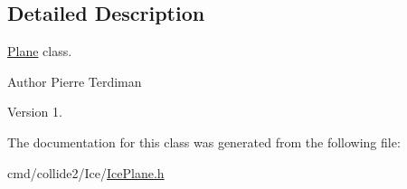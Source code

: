 \subsection{Detailed Description}
\hyperlink{classPlane}{Plane} class.

\begin{DoxyAuthor}{Author}
Pierre Terdiman 
\end{DoxyAuthor}
\begin{DoxyVersion}{Version}
1. 
\end{DoxyVersion}


The documentation for this class was generated from the following file\+:\begin{DoxyCompactItemize}
\item 
cmd/collide2/\+Ice/\hyperlink{IcePlane_8h}{Ice\+Plane.\+h}\end{DoxyCompactItemize}
